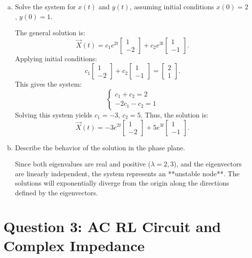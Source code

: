 \documentclass{article}
\begin{document}
\begin{enumerate}[a)]
  \item Solve the system for \( x(t) \) and \( y(t) \), assuming initial conditions \( x(0) = 2 \), \( y(0) = 1 \).

  The general solution is:
  \[
  \vec{X}(t) = c_1 e^{2t} \begin{bmatrix} 1 \\ -2 \end{bmatrix} + c_2 e^{3t} \begin{bmatrix} 1 \\ -1 \end{bmatrix}.
  \]
  Applying initial conditions:
  \[
  c_1 \begin{bmatrix} 1 \\ -2 \end{bmatrix} + c_2 \begin{bmatrix} 1 \\ -1 \end{bmatrix} = \begin{bmatrix} 2 \\ 1 \end{bmatrix}.
  \]
  This gives the system:
  \[
  \begin{cases}
    c_1 + c_2 = 2 \\
    -2c_1 - c_2 = 1
  \end{cases}
  \]
  Solving this system yields \( c_1 = -3 \), \( c_2 = 5 \). Thus, the solution is:
  \[
  \vec{X}(t) = -3 e^{2t} \begin{bmatrix} 1 \\ -2 \end{bmatrix} + 5 e^{3t} \begin{bmatrix} 1 \\ -1 \end{bmatrix}.
  \]

  \item Describe the behavior of the solution in the phase plane.

  Since both eigenvalues are real and positive (\( \lambda = 2, 3 \)), and the eigenvectors are linearly independent, the system represents an **unstable node**. The solutions will exponentially diverge from the origin along the directions defined by the eigenvectors.
\end{enumerate}

\section*{Question 3: AC RL Circuit and Complex Impedance}
\end{document}
